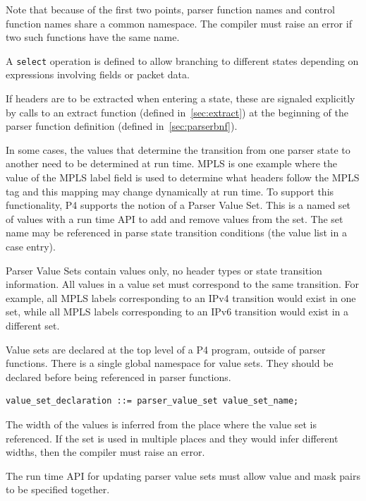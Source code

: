 \documentclass[12pt]{article}
\begin{document}
Note that because of the first two points, parser function names and
control function names share a common namespace.  The compiler must
raise an error if two such functions have the same name.

A \texttt{select} operation is defined to allow branching to different
states depending on expressions involving fields or packet data.

If headers are to be extracted when entering a state, these are
signaled explicitly by calls to an extract function (defined in~\ref{sec:extract}) 
at the beginning of the parser function definition (defined in~\ref{sec:parserbnf}).


In some cases, the values that determine the transition from one
parser state to another need to be determined at run time. MPLS is one
example where the value of the MPLS label field is used to determine
what headers follow the MPLS tag and this mapping may change
dynamically at run time. To support this functionality, P4 supports
the notion of a Parser Value Set. This is a named set of values with a
run time API to add and remove values from the set. The set name may
be referenced in parse state transition conditions (the value list in
a case entry).

Parser Value Sets contain values only, no header types or state transition 
information. All values in a value set must correspond to the same transition. 
For example, all MPLS labels corresponding to an IPv4 transition would exist 
in one set, while all MPLS labels corresponding to an IPv6 transition would 
exist in a different set.

Value sets are declared at the top level of a P4 program, outside of parser 
functions. There is a single global namespace for value sets. They should 
be declared before being referenced in parser functions.

\begin{lstlisting}[style=BNFstyle]
value_set_declaration ::= parser_value_set value_set_name;
\end{lstlisting}

The width of the values is inferred from the place where the value set is 
referenced.  If the set is used in multiple places and they would infer
different widths, then the compiler must raise an error.

The run time API for updating parser value sets must allow value and mask
pairs to be specified together.
\end{document}
